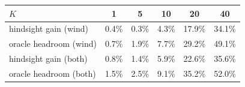\begin{tabular}{lccccc}
\toprule
$K$ & 1 & 5 & 10 & 20 & 40 \\
\midrule
hindsight gain (wind) & 0.4\% & 0.3\% & 4.3\% & 17.9\% & 34.1\% \\
oracle headroom (wind) & 0.7\% & 1.9\% & 7.7\% & 29.2\% & 49.1\% \\
hindsight gain (both) & 0.8\% & 1.4\% & 5.9\% & 22.6\% & 35.6\% \\
oracle headroom (both) & 1.5\% & 2.5\% & 9.1\% & 35.2\% & 52.0\% \\
\bottomrule
\end{tabular}
